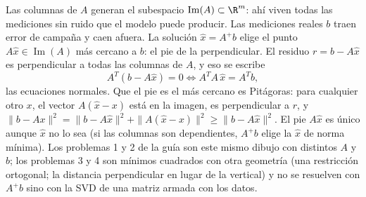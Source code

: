 \begin{idea}
Las columnas de \(A\) generan el subespacio \(\operatorname{Im}(A)\subset\R^m\): ahí viven
todas las mediciones sin ruido que el modelo puede producir. Las mediciones reales \(b\)
traen error de campaña y caen afuera. La solución \(\hat x=A^{+}b\) elige el punto
\(A\hat x\in\operatorname{Im}(A)\) más cercano a \(b\): el pie de la perpendicular. El
residuo \(r=b-A\hat x\) es perpendicular a todas las columnas de \(A\), y eso se escribe
\[
  A^T(b-A\hat x)=0\iff A^TA\,\hat x=A^Tb ,
\]
las ecuaciones normales. Que el pie es el más cercano es Pitágoras: para cualquier otro
\(x\), el vector \(A(\hat x-x)\) está en la imagen, es perpendicular a \(r\), y
\(\|b-Ax\|^2=\|b-A\hat x\|^2+\|A(\hat x-x)\|^2\ge\|b-A\hat x\|^2\). El pie \(A\hat x\) es
único aunque \(\hat x\) no lo sea (si las columnas son dependientes, \(A^{+}b\) elige la
\(\hat x\) de norma mínima). Los problemas 1 y 2 de la guía son este mismo dibujo con
distintos \(A\) y \(b\); los problemas 3 y 4 son mínimos cuadrados con otra geometría (una
restricción ortogonal; la distancia perpendicular en lugar de la vertical) y no se
resuelven con \(A^{+}b\) sino con la SVD de una matriz armada con los datos.

\begin{center}
\end{center}
\end{idea}


